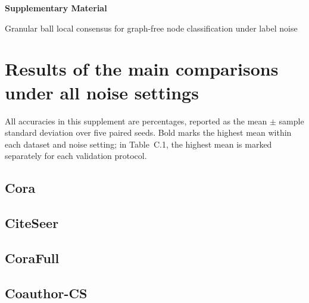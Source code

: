 \documentclass[10pt,letterpaper,nopreprintline]{elsarticle}
\begin{document}
\begin{center}{\Large\bfseries Supplementary Material}\par\medskip Granular ball local consensus for graph-free node classification under label noise\end{center}

\appendix
\renewcommand{\thetable}{\Alph{section}.\arabic{table}}
\renewcommand{\theHtable}{\Alph{section}.\arabic{table}}

\FloatBarrier

\setcounter{table}{0}

\section{Results of the main comparisons under all noise settings}\label{sec:A}

All accuracies in this supplement are percentages, reported as the mean \(\pm\) sample standard deviation over five paired seeds. Bold marks the highest mean within each dataset and noise setting; in Table~C.1, the highest mean is marked separately for each validation protocol.

\Needspace{120pt}

\subsection{Cora}\label{sec:A.1}



\Needspace{120pt}

\subsection{CiteSeer}\label{sec:A.2}



\Needspace{120pt}

\subsection{CoraFull}\label{sec:A.3}



\Needspace{120pt}

\subsection{Coauthor-CS}\label{sec:A.4}
\end{document}
